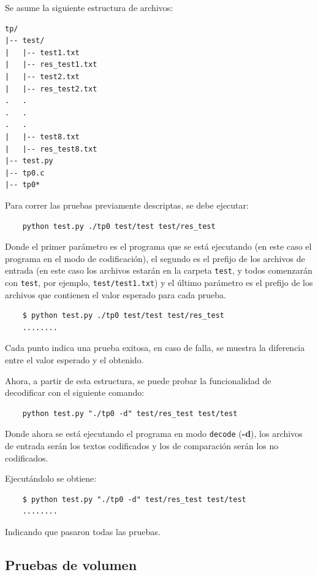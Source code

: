 \documentclass[titlepage,a4paper]{article}
\begin{document}
Se asume la siguiente estructura de archivos:

\begin{lstlisting}[style=test_run_style]
tp/
|-- test/
|   |-- test1.txt
|   |-- res_test1.txt
|   |-- test2.txt
|   |-- res_test2.txt
.   .
.   .
.   .
|   |-- test8.txt
|   |-- res_test8.txt
|-- test.py
|-- tp0.c
|-- tp0*
\end{lstlisting}


Para correr las pruebas previamente descriptas, se debe ejecutar:
\begin{verbatim}
    python test.py ./tp0 test/test test/res_test
\end{verbatim}
Donde el primer parámetro es el programa que se está ejecutando (en este caso el programa en el modo de codificación), el segundo es el prefijo de los archivos de entrada (en este caso los archivos estarán en la carpeta \verb|test|, y todos comenzarán con \verb|test|, por ejemplo, \verb|test/test1.txt|) y el último parámetro es el prefijo de los archivos que contienen el valor esperado para cada prueba.

\begin{verbatim}
    $ python test.py ./tp0 test/test test/res_test
    ........
\end{verbatim}

Cada punto indica una prueba exitosa, en caso de falla, se muestra la diferencia entre el valor esperado y el obtenido.

Ahora, a partir de esta estructura, se puede probar la funcionalidad de decodificar con el siguiente comando:

\begin{verbatim}
    python test.py "./tp0 -d" test/res_test test/test
\end{verbatim}

Donde ahora se está ejecutando el programa en modo \verb|decode| (\textbf{-d}), los archivos de entrada serán los textos codificados y los de comparación serán los no codificados.

Ejecutándolo se obtiene:
\begin{verbatim}
    $ python test.py "./tp0 -d" test/res_test test/test
    ........
\end{verbatim}
Indicando que pasaron todas las pruebas.

\subsection{Pruebas de volumen}
\end{document}
